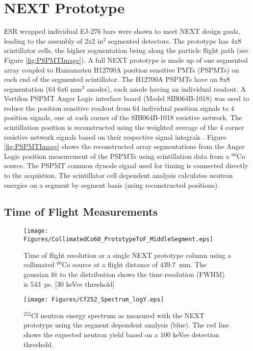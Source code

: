 \section{NEXT Prototype} \label{Prototype}

ESR wrapped individual EJ-276 bars were shown to meet NEXT design goals, leading to the assembly of 2x2 in$^{2}$ segmented detectors. The prototype has 4x8 scintillator cells, the higher segmentation being along the particle flight path (see Figure \ref{fig:PSPMTImage}). A full NEXT prototype is made up of one segmented array coupled to Hamamatsu H12700A position sensitive PMTs (PSPMTs) on each end of the segmented scintillator. The H12700A PSPMTs have an 8x8 segmentation (64 6x6 mm$^{2}$ anodes), each anode having an individual readout. A Vertilon PSPMT Anger Logic interface board (Model SIB064B-1018) was used to reduce the position sensitive readout from 64 individual position signals to 4 position signals, one at each corner of the SIB064B-1018 resistive network. The scintillation position is reconstructed using the weighted average of the 4 corner resistive network signals based on their respective signal integrals \cite{ANGER}. Figure \ref{fig:PSPMTImage} shows the reconstructed array segmentations from the Anger Logic position measurement of the PSPMTs using scintillation data from a $^{60}$Co source. The PSPMT common dynode signal used for timing is connected directly to the acquistion. The scintillator cell dependent analysis calculates neutron energies on a segment by segment basis (using reconstructed positions).

\subsection{Time of Flight Measurements}
\begin{figure}[tp]
 \centering
 \texttt{[image: Figures/CollimatedCo60\_PrototypeToF\_MiddleSegment.eps]}
 \caption{Time of flight resolution or a single NEXT prototype column using a collimated $^{60}$Co source at a flight distance of 439.7~mm. The gaussian fit to the distribution shows the time resolution (FWHM) is 543~ps. [30 keVee threshold]}
 \label{fig:CollimatedCoToF}
\end{figure}
\begin{figure}[tb]
  \centering
  \texttt{[image: Figures/Cf252\_Spectrum\_logY.eps]}
  \caption{$^{252}$Cf neutron energy spectrum as measured with the NEXT prototype using the segment dependent analysis (blue). The red line shows the expected neutron yield based on a 100 keVee detection threshold.}
  \label{fig:Cf252Spectrum}
\end{figure}


